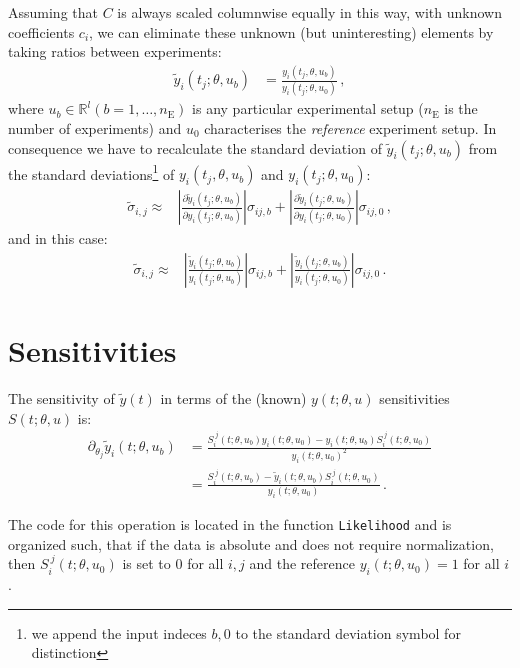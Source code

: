 \documentclass[utf8,english]{scrartcl}
\begin{document}
Assuming that $C$ is always scaled columnwise equally in this way,
 with unknown coefficients $c_i$, we can eliminate these unknown
(but uninteresting) elements by taking ratios between experiments:
\begin{align}
  \tilde y_i(t_j;\theta,u_b) &=
  \frac{y_i(t_j,\theta,u_b)}{y_i(t_j;\theta,u_0)}\,,
\end{align}
where $u_b\in\mathbb{R}^l (b=1,\dots,n_{\text{E}})$ is any particular
experimental setup ($n_{\text{E}}$ is the number of experiments) and
$u_0$ characterises the \emph{reference} experiment setup.  In
consequence we have to recalculate the standard deviation of $\tilde
y_i(t_j;\theta,u_b)$ from the standard deviations\footnote{we append
  the input indeces $b,0$ to the standard deviation symbol for
  distinction} of ${y_i(t_j,\theta,u_b)}$ and ${y_i(t_j;\theta,u_0)}$:
\begin{align}
  \label{eq:std_y}
  \tilde\sigma_{i,j}\approx&\left|\frac{\partial\tilde
      y_i(t_j;\theta,u_b)}{\partial
      y_i(t_j;\theta,u_b)}\right|\sigma_{ij,b} +
  \left|\frac{\partial\tilde y_i(t_j;\theta,u_b)}{\partial
      y_i(t_j;\theta,u_0)}\right|\sigma_{ij,0}\,,
\end{align}
and in this case:
\begin{align}
  \label{eq:std_yy}
  \tilde\sigma_{i,j}\approx&\left|\frac{\tilde
      y_i(t_j;\theta,u_b)}{y_i(t_j;\theta,u_b)}\right|\sigma_{ij,b} +
  \left|\frac{\tilde
      y_i(t_j;\theta,u_b)}{y_i(t_j;\theta,u_0)}\right|\sigma_{ij,0}\,.
\end{align}


\section{Sensitivities}
\label{sec:sens}

The sensitivity of $\tilde y(t)$ in terms of the (known) $y(t;\theta,u)$ sensitivities $S(t;\theta,u)$ is:
\begin{align}
  \partial_{\theta_j} \tilde y_i(t;\theta,u_b) 
  &= \frac{S_i^{~j}(t;\theta,u_b)y_i(t;\theta,u_0)
    -y_i(t;\theta,u_b)S_i^{~j}(t;\theta,u_0)}{y_i(t;\theta,u_0)^2}\nonumber\\
  &= \frac{S_i^{~j}(t;\theta,u_b) 
    - \tilde y_i(t;\theta,u_b)S_i^{~j}(t;\theta,u_0)}{y_i(t;\theta,u_0)}\,.  \label{eq:fyS}
\end{align}

The code for this operation is located in the function
\texttt{Likelihood} and is organized such, that if the data is
absolute and does not require normalization, then
$S_i^{~j}(t;\theta,u_0)$ is set to $0$ for all $i,j$ and the reference
$y_i(t;\theta,u_0)=1$ for all $i$.
\end{document}
